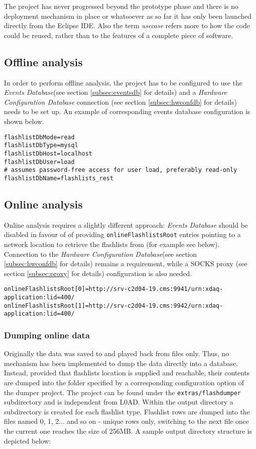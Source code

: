 The project has never progressed beyond the prototype phase and there is no deployment mechanism in place or whatsoever as so far it has only been launched directly from the Eclipse IDE. Also the term \textit{usecase} refers more to how the code could be reused, rather than to the features of a complete piece of software.

\subsection{Offline analysis}
In order to perform offline analysis, the project has to be configured to use the \emph{Events Database}(see section \ref{subsec:eventsdb} for details) and a \emph{Hardware Configuration Database} connection (see section \ref{subsec:hwconfdb} for details) needs to be set up. An example of corresponding events database configuration is shown below.

\begin{lstlisting}
flashlistDbMode=read
flashlistDbType=mysql
flashlistDbHost=localhost
flashlistDbUser=load
# assumes password-free access for user load, preferably read-only
flashlistDbName=flashlists_rest
\end{lstlisting}


\subsection{Online analysis}
Online analysis requires a slightly different approach: \emph{Events Database} should be disabled in favour of of providing \texttt{onlineFlashlistsRoot} entries pointing to a network location to retrieve the flashlists from (for example see below). 
Connection to the \emph{Hardware Configuration Database}(see section \ref{subsec:hwconfdb} for details) remains a requirement, while a SOCKS proxy (see section \ref{subsec:proxy} for details) configuration is also needed.

\begin{lstlisting}
onlineFlashlistsRoot[0]=http://srv-c2d04-19.cms:9941/urn:xdaq-application:lid=400/
onlineFlashlistsRoot[1]=http://srv-c2d04-19.cms:9942/urn:xdaq-application:lid=400/
\end{lstlisting}


\subsubsection{Dumping online data}
Originally the data was saved to and played back from files only. Thus, no mechanism has been implemented to dump the data directly into a database. Instead, provided that flashlists location is supplied and reachable, their contents are dumped into the folder specified by a corresponding configuration option of the dumper project. The project can be found under the \texttt{extras/flashdumper} subdirectory and is independent from L0AD.
Within the output directory a subdirectory is created for each flashlist type. Flashlist rows are dumped into the files named 0, 1, 2... and so on - unique rows only, switching to the next file once the current one reaches the size of 256MB. A sample output directory structure is depicted below:

